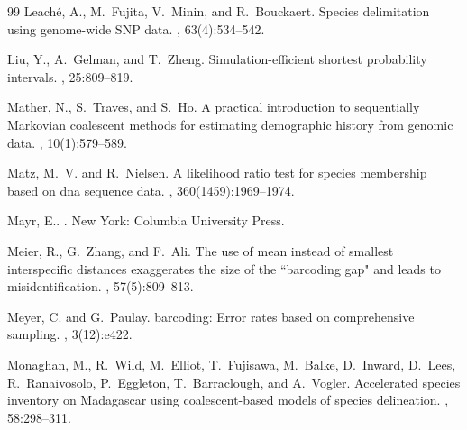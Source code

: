 \documentclass[12pt]{article}
\begin{document}
\begin{thebibliography}{99}
Leach\'{e}, A., M.~Fujita, V.~Minin, and
  R.~Bouckaert\leavevmode\nopagebreak{}.
\newblock Species delimitation using genome-wide {SNP} data.
, 63(4):534--542.

Liu, Y., A.~Gelman, and T.~Zheng\leavevmode\nopagebreak{}.
\newblock Simulation-efficient shortest probability intervals.
, 25:809--819.

Mather, N., S.~Traves, and S.~Ho\leavevmode\nopagebreak{}.
\newblock A practical introduction to sequentially {M}arkovian coalescent
  methods for estimating demographic history from genomic data.
, 10(1):579--589.

Matz, M.~V. and R.~Nielsen\leavevmode\nopagebreak{}.
\newblock A likelihood ratio test for species membership based on dna sequence
  data.
, 360(1459):1969--1974.

Mayr, E.\leavevmode\nopagebreak{}.
.
\newblock New York: Columbia University Press.

Meier, R., G.~Zhang, and F.~Ali\leavevmode\nopagebreak{}.
\newblock The use of mean instead of smallest interspecific distances
  exaggerates the size of the ``barcoding gap" and leads to misidentification.
, 57(5):809--813.

Meyer, C. and G.~Paulay\leavevmode\nopagebreak{}.
 barcoding: {E}rror rates based on comprehensive sampling.
, 3(12):e422.

Monaghan, M., R.~Wild, M.~Elliot, T.~Fujisawa, M.~Balke, D.~Inward, D.~Lees,
  R.~Ranaivosolo, P.~Eggleton, T.~Barraclough, and
  A.~Vogler\leavevmode\nopagebreak{}.
\newblock Accelerated species inventory on {M}adagascar using coalescent-based
  models of species delineation.
, 58:298--311.


\end{thebibliography}
\end{document}

